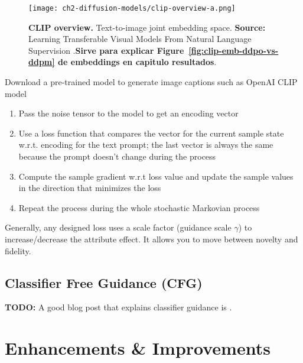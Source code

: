 \begin{figure}[ht]
    \centering
    \texttt{[image: ch2-diffusion-models/clip-overview-a.png]}
    \captionsetup{width=\textwidth} %
    \caption{\textbf{CLIP overview.} Text-to-image joint embedding space. \textbf{Source:} Learning Transferable Visual Models From Natural Language Supervision \citep{radford2021learning}.\textbf{Sirve para explicar Figure~\ref{fig:clip-emb-ddpo-vs-ddpm} de embeddings en capitulo resultados}.}
    \label{fig:clip-overview}
  \end{figure}

  Download a pre-trained model to generate image captions such as OpenAI CLIP model
  
  \begin{enumerate}
    \item Pass the noise tensor to the model to get an encoding vector
    \item Use a loss function that compares the vector for the current sample state w.r.t. encoding for the text prompt; the last vector is always the same because the prompt doesn’t change during the process
    \item Compute the sample gradient w.r.t loss value and update the sample values in the direction that minimizes the loss
    \item Repeat the process during the whole stochastic Markovian process
  \end{enumerate}

Generally, any designed loss uses a scale factor (guidance scale $\gamma$) to increase/decrease the attribute effect. It allows you to move between novelty and fidelity. 

\subsection{Classifier Free Guidance (CFG)}

    \textbf{TODO:} A good blog post that explains classifier guidance is \cite{dieleman2022guidance}. \\


\section{Enhancements \& Improvements}

